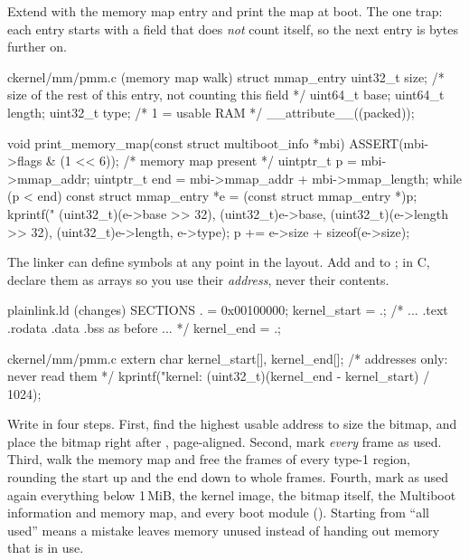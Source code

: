\documentclass[11pt,a4paper]{article}
\begin{document}
Extend  with the memory map entry and print the map at boot. The one trap: each entry starts with a
 field that does \emph{not} count itself, so the next entry is  bytes further on.

\begin{lst}{c}{kernel/mm/pmm.c (memory map walk)}
struct mmap_entry {
    uint32_t size;          /* size of the rest of this entry, not counting this field */
    uint64_t base;
    uint64_t length;
    uint32_t type;          /* 1 = usable RAM */
} __attribute__((packed));

void print_memory_map(const struct multiboot_info *mbi)
{
    ASSERT(mbi->flags & (1 << 6));                  /* memory map present */
    uintptr_t p   = mbi->mmap_addr;
    uintptr_t end = mbi->mmap_addr + mbi->mmap_length;
    while (p < end) {
        const struct mmap_entry *e = (const struct mmap_entry *)p;
        kprintf("  %
                (uint32_t)(e->base >> 32), (uint32_t)e->base,
                (uint32_t)(e->length >> 32), (uint32_t)e->length, e->type);
        p += e->size + sizeof(e->size);
    }
}
\end{lst}

The linker can define symbols at any point in the layout. Add  and  to
; in C, declare them as arrays so you use their \emph{address}, never their contents.

\begin{lst}{plain}{link.ld (changes)}
SECTIONS
{
    . = 0x00100000;
    kernel_start = .;
    /* ... .text .rodata .data .bss as before ... */
    kernel_end = .;
}
\end{lst}

\begin{lst}{c}{kernel/mm/pmm.c}
extern char kernel_start[], kernel_end[];     /* addresses only: never read them */
kprintf("kernel: %
        (uint32_t)(kernel_end - kernel_start) / 1024);
\end{lst}

Write  in four steps. First, find the highest usable address to size the bitmap, and place the
bitmap right after , page-aligned. Second, mark \emph{every} frame as used. Third, walk the memory
map and free the frames of every type-1 region, rounding the start up and the end down to whole frames. Fourth,
mark as used again everything below 1\,MiB, the kernel image, the bitmap itself, the Multiboot information and memory
map, and every boot module (). Starting from ``all used'' means a mistake leaves memory unused instead
of handing out memory that is in use.
\end{document}
